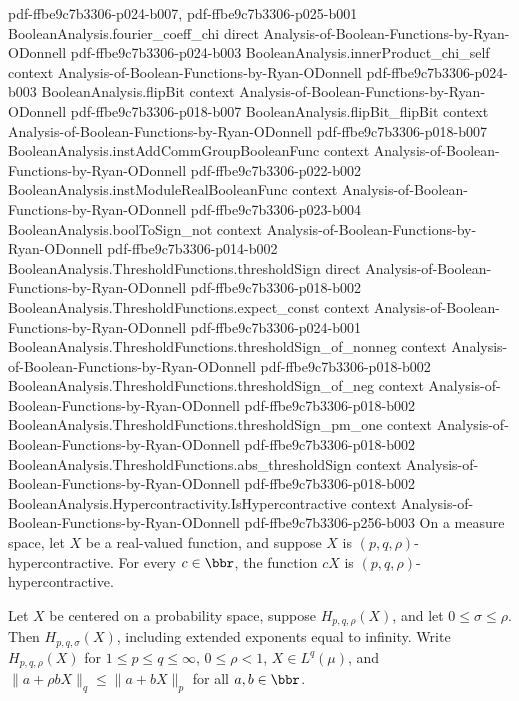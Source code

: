 \begin{theorem}
  {pdf-ffbe9c7b3306-p024-b007,
    pdf-ffbe9c7b3306-p025-b001}
\proofstep
  {BooleanAnalysis.fourier_coeff_chi}
  {direct}
  {Analysis-of-Boolean-Functions-by-Ryan-ODonnell}
  {pdf-ffbe9c7b3306-p024-b003}
\proofstep
  {BooleanAnalysis.innerProduct_chi_self}
  {context}
  {Analysis-of-Boolean-Functions-by-Ryan-ODonnell}
  {pdf-ffbe9c7b3306-p024-b003}
\proofstep
  {BooleanAnalysis.flipBit}
  {context}
  {Analysis-of-Boolean-Functions-by-Ryan-ODonnell}
  {pdf-ffbe9c7b3306-p018-b007}
\proofstep
  {BooleanAnalysis.flipBit_flipBit}
  {context}
  {Analysis-of-Boolean-Functions-by-Ryan-ODonnell}
  {pdf-ffbe9c7b3306-p018-b007}
\proofstep
  {BooleanAnalysis.instAddCommGroupBooleanFunc}
  {context}
  {Analysis-of-Boolean-Functions-by-Ryan-ODonnell}
  {pdf-ffbe9c7b3306-p022-b002}
\proofstep
  {BooleanAnalysis.instModuleRealBooleanFunc}
  {context}
  {Analysis-of-Boolean-Functions-by-Ryan-ODonnell}
  {pdf-ffbe9c7b3306-p023-b004}
\proofstep
  {BooleanAnalysis.boolToSign_not}
  {context}
  {Analysis-of-Boolean-Functions-by-Ryan-ODonnell}
  {pdf-ffbe9c7b3306-p014-b002}
\proofstep
  {BooleanAnalysis.ThresholdFunctions.thresholdSign}
  {direct}
  {Analysis-of-Boolean-Functions-by-Ryan-ODonnell}
  {pdf-ffbe9c7b3306-p018-b002}
\proofstep
  {BooleanAnalysis.ThresholdFunctions.expect_const}
  {context}
  {Analysis-of-Boolean-Functions-by-Ryan-ODonnell}
  {pdf-ffbe9c7b3306-p024-b001}
\proofstep
  {BooleanAnalysis.ThresholdFunctions.thresholdSign_of_nonneg}
  {context}
  {Analysis-of-Boolean-Functions-by-Ryan-ODonnell}
  {pdf-ffbe9c7b3306-p018-b002}
\proofstep
  {BooleanAnalysis.ThresholdFunctions.thresholdSign_of_neg}
  {context}
  {Analysis-of-Boolean-Functions-by-Ryan-ODonnell}
  {pdf-ffbe9c7b3306-p018-b002}
\proofstep
  {BooleanAnalysis.ThresholdFunctions.thresholdSign_pm_one}
  {context}
  {Analysis-of-Boolean-Functions-by-Ryan-ODonnell}
  {pdf-ffbe9c7b3306-p018-b002}
\proofstep
  {BooleanAnalysis.ThresholdFunctions.abs_thresholdSign}
  {context}
  {Analysis-of-Boolean-Functions-by-Ryan-ODonnell}
  {pdf-ffbe9c7b3306-p018-b002}
\proofstep
  {BooleanAnalysis.Hypercontractivity.IsHypercontractive}
  {context}
  {Analysis-of-Boolean-Functions-by-Ryan-ODonnell}
  {pdf-ffbe9c7b3306-p256-b003}
On a measure space, let $X$ be a real-valued function, and suppose $X$ is $(p,q,\rho)$-hypercontractive. For every $c\in\bbr$, the function $cX$ is
$(p,q,\rho)$-hypercontractive.
\end{theorem}

\begin{theorem}
\leanok
{}
Let $X$ be centered on a probability space, suppose $H_{p,q,\rho}(X)$, and let $0\le\sigma\le\rho$. Then $H_{p,q,\sigma}(X)$, including extended exponents equal to infinity. Write $H_{p,q,\rho}(X)$ for $1\le p\le q\le\infty$, $0\le\rho<1$, $X\in L^q(\mu)$, and $\|a+\rho bX\|_q\le\|a+bX\|_p$ for all $a,b\in\bbr$.
\end{theorem}

